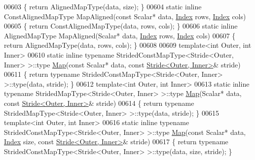 \begin{DoxyCode}
00603     \{ \textcolor{keywordflow}{return} AlignedMapType(data, size); \}
00604     \textcolor{keyword}{static} \textcolor{keyword}{inline} ConstAlignedMapType MapAligned(\textcolor{keyword}{const} Scalar* data, \hyperlink{namespace_eigen_a62e77e0933482dafde8fe197d9a2cfde}{Index} rows, 
      \hyperlink{namespace_eigen_a62e77e0933482dafde8fe197d9a2cfde}{Index} cols)
00605     \{ \textcolor{keywordflow}{return} ConstAlignedMapType(data, rows, cols); \}
00606     \textcolor{keyword}{static} \textcolor{keyword}{inline} AlignedMapType MapAligned(Scalar* data, \hyperlink{namespace_eigen_a62e77e0933482dafde8fe197d9a2cfde}{Index} rows, \hyperlink{namespace_eigen_a62e77e0933482dafde8fe197d9a2cfde}{Index} cols)
00607     \{ \textcolor{keywordflow}{return} AlignedMapType(data, rows, cols); \}
00608 
00609     \textcolor{keyword}{template}<\textcolor{keywordtype}{int} Outer, \textcolor{keywordtype}{int} Inner>
00610     \textcolor{keyword}{static} \textcolor{keyword}{inline} \textcolor{keyword}{typename} StridedConstMapType<Stride<Outer, Inner> >::type \hyperlink{group___core___module_class_eigen_1_1_map}{Map}(\textcolor{keyword}{const} Scalar* data, \textcolor{keyword}{
      const} \hyperlink{group___core___module_class_eigen_1_1_stride}{Stride<Outer, Inner>}& stride)
00611     \{ \textcolor{keywordflow}{return} \textcolor{keyword}{typename} StridedConstMapType<Stride<Outer, Inner> >::type(data, stride); \}
00612     \textcolor{keyword}{template}<\textcolor{keywordtype}{int} Outer, \textcolor{keywordtype}{int} Inner>
00613     \textcolor{keyword}{static} \textcolor{keyword}{inline} \textcolor{keyword}{typename} StridedMapType<Stride<Outer, Inner> >::type \hyperlink{group___core___module_class_eigen_1_1_map}{Map}(Scalar* data, \textcolor{keyword}{const} 
      \hyperlink{group___core___module_class_eigen_1_1_stride}{Stride<Outer, Inner>}& stride)
00614     \{ \textcolor{keywordflow}{return} \textcolor{keyword}{typename} StridedMapType<Stride<Outer, Inner> >::type(data, stride); \}
00615     \textcolor{keyword}{template}<\textcolor{keywordtype}{int} Outer, \textcolor{keywordtype}{int} Inner>
00616     \textcolor{keyword}{static} \textcolor{keyword}{inline} \textcolor{keyword}{typename} StridedConstMapType<Stride<Outer, Inner> >::type \hyperlink{group___core___module_class_eigen_1_1_map}{Map}(\textcolor{keyword}{const} Scalar* data, 
      \hyperlink{namespace_eigen_a62e77e0933482dafde8fe197d9a2cfde}{Index} size, \textcolor{keyword}{const} \hyperlink{group___core___module_class_eigen_1_1_stride}{Stride<Outer, Inner>}& stride)
00617     \{ \textcolor{keywordflow}{return} \textcolor{keyword}{typename} StridedConstMapType<Stride<Outer, Inner> >::type(data, size, stride); \}

\end{DoxyCode}
